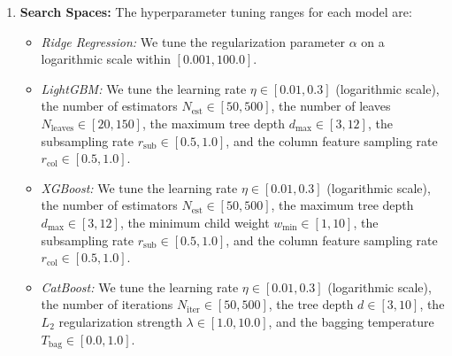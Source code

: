 \begin{enumerate}
    \item \textbf{Search Spaces:} The hyperparameter tuning ranges for each model are:
    \begin{itemize}
        \item \textit{Ridge Regression:} We tune the regularization parameter $\alpha$ on a logarithmic scale within $[0.001, 100.0]$.
        \item \textit{LightGBM:} We tune the learning rate $\eta \in [0.01, 0.3]$ (logarithmic scale), the number of estimators $N_{\text{est}} \in [50, 500]$, the number of leaves $N_{\text{leaves}} \in [20, 150]$, the maximum tree depth $d_{\text{max}} \in [3, 12]$, the subsampling rate $r_{\text{sub}} \in [0.5, 1.0]$, and the column feature sampling rate $r_{\text{col}} \in [0.5, 1.0]$.
        \item \textit{XGBoost:} We tune the learning rate $\eta \in [0.01, 0.3]$ (logarithmic scale), the number of estimators $N_{\text{est}} \in [50, 500]$, the maximum tree depth $d_{\text{max}} \in [3, 12]$, the minimum child weight $w_{\text{min}} \in [1, 10]$, the subsampling rate $r_{\text{sub}} \in [0.5, 1.0]$, and the column feature sampling rate $r_{\text{col}} \in [0.5, 1.0]$.
        \item \textit{CatBoost:} We tune the learning rate $\eta \in [0.01, 0.3]$ (logarithmic scale), the number of iterations $N_{\text{iter}} \in [50, 500]$, the tree depth $d \in [3, 10]$, the $L_2$ regularization strength $\lambda \in [1.0, 10.0]$, and the bagging temperature $T_{\text{bag}} \in [0.0, 1.0]$.
    \end{itemize}
\end{enumerate}

